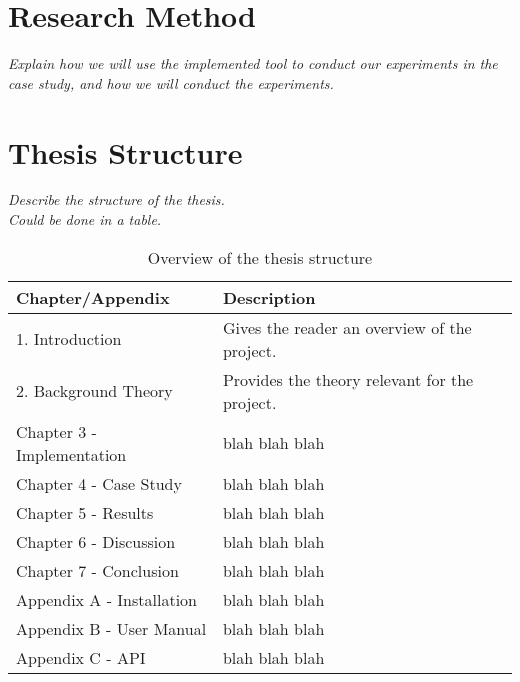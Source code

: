 \section{Research Method}

\textit{Explain how we will use the implemented tool to conduct our experiments in the case study, and how we will conduct the experiments.}

\section{Thesis Structure}

\textit{Describe the structure of the thesis. \\
Could be done in a table.}

\begin{table}[!h]
\begin{center}
\begin{tabular}{ | l | l |}
\hline
\textbf{Chapter/Appendix} & \textbf{Description} \\ \hline
1. Introduction & Gives the reader an overview of the project. \\ \hline
2. Background Theory & Provides the theory relevant for the project. \\ \hline
Chapter 3 - Implementation & blah blah blah \\ \hline
Chapter 4 - Case Study & blah blah blah \\ \hline
Chapter 5 - Results & blah blah blah \\ \hline
Chapter 6 - Discussion & blah blah blah \\ \hline
Chapter 7 - Conclusion & blah blah blah \\ \hline
Appendix A - Installation & blah blah blah \\ \hline
Appendix B - User Manual & blah blah blah \\ \hline
Appendix C - API & blah blah blah \\ \hline
\end{tabular}
\end{center}
\caption{Overview of the thesis structure}
\label{Tab1}
\end{table}

\cleardoublepage
